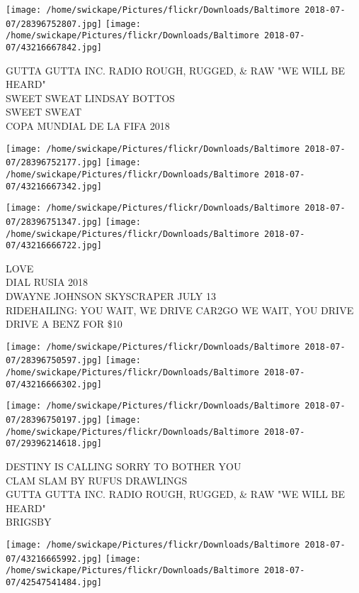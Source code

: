 \documentclass[10pt,letterpaper]{article}
\begin{document}
\texttt{[image: /home/swickape/Pictures/flickr/Downloads/Baltimore 2018-07-07/28396752807.jpg]}
\texttt{[image: /home/swickape/Pictures/flickr/Downloads/Baltimore 2018-07-07/43216667842.jpg]}

GUTTA GUTTA INC. RADIO ROUGH, RUGGED, \& RAW "WE WILL BE HEARD"\\
SWEET SWEAT LINDSAY BOTTOS\\
SWEET SWEAT\\
COPA MUNDIAL DE LA FIFA 2018\\
\pagebreak

\texttt{[image: /home/swickape/Pictures/flickr/Downloads/Baltimore 2018-07-07/28396752177.jpg]}
\texttt{[image: /home/swickape/Pictures/flickr/Downloads/Baltimore 2018-07-07/43216667342.jpg]}

\texttt{[image: /home/swickape/Pictures/flickr/Downloads/Baltimore 2018-07-07/28396751347.jpg]}
\texttt{[image: /home/swickape/Pictures/flickr/Downloads/Baltimore 2018-07-07/43216666722.jpg]}

LOVE\\
DIAL RUSIA 2018\\
DWAYNE JOHNSON SKYSCRAPER JULY 13\\
RIDEHAILING: YOU WAIT, WE DRIVE CAR2GO WE WAIT, YOU DRIVE DRIVE A BENZ FOR \$10\\
\pagebreak

\texttt{[image: /home/swickape/Pictures/flickr/Downloads/Baltimore 2018-07-07/28396750597.jpg]}
\texttt{[image: /home/swickape/Pictures/flickr/Downloads/Baltimore 2018-07-07/43216666302.jpg]}

\texttt{[image: /home/swickape/Pictures/flickr/Downloads/Baltimore 2018-07-07/28396750197.jpg]}
\texttt{[image: /home/swickape/Pictures/flickr/Downloads/Baltimore 2018-07-07/29396214618.jpg]}

DESTINY IS CALLING SORRY TO BOTHER YOU\\
CLAM SLAM BY RUFUS DRAWLINGS\\
GUTTA GUTTA INC. RADIO ROUGH, RUGGED, \& RAW "WE WILL BE HEARD"\\
BRIGSBY\\
\pagebreak

\texttt{[image: /home/swickape/Pictures/flickr/Downloads/Baltimore 2018-07-07/43216665992.jpg]}
\texttt{[image: /home/swickape/Pictures/flickr/Downloads/Baltimore 2018-07-07/42547541484.jpg]}
\end{document}
